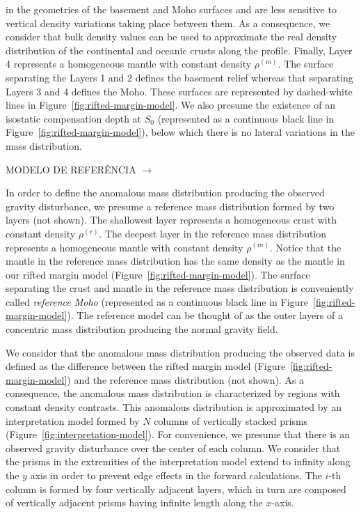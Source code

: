 \documentclass[manuscript]{geophysics}
\begin{document}
in the geometries of the basement and Moho surfaces and are less sensitive to vertical density variations 
taking place between them. As a consequence, we consider that bulk density values can be used 
to approximate the real density distribution of the continental and oceanic crusts along
the profile.
Finally, Layer 4 represents a homogeneous mantle with constant density $\rho^{(m)}$. 
The surface separating the Layers 1 and 2 defines the basement relief whereas
that separating Layers 3 and 4 defines the Moho. These surfaces are
represented by dashed-white lines in Figure~\ref{fig:rifted-margin-model}.
We also presume the existence of an isostatic compensation depth at $S_{0}$ 
(represented as a continuous black line in Figure~\ref{fig:rifted-margin-model}),
below which there is no lateral variations in the mass distribution.

MODELO DE REFERÊNCIA $\rightarrow$

In order to define the anomalous mass distribution producing the observed gravity
disturbance, we presume a reference mass distribution formed by two 
layers (not shown). The shallowest layer represents a homogeneous crust with constant
density $\rho^{(r)}$.
The deepest layer in the reference mass distribution represents a homogeneous mantle
with constant density $\rho^{(m)}$. Notice that the mantle in the reference mass 
distribution has the same density as the mantle in our rifted margin model
(Figure~\ref{fig:rifted-margin-model}).
The surface separating the crust and mantle in the reference mass distribution 
is conveniently called \textit{reference Moho} (represented as a continuous black line
in Figure~\ref{fig:rifted-margin-model}).
The reference model can be thought of as the outer layers of a concentric
mass distribution producing the normal gravity field.

We consider that the anomalous mass distribution producing the observed data
is defined as the difference between the rifted margin model 
(Figure~\ref{fig:rifted-margin-model}) and the reference mass distribution (not shown).
As a consequence, the anomalous mass distribution is characterized by regions
with constant density contrasts.
This anomalous distribution is approximated by an interpretation model 
formed by $N$ columns of vertically stacked prisms 
(Figure~\ref{fig:interpretation-model}).
For convenience, we presume that there is an observed gravity disturbance over the
center of each column.
We consider that the prisms in the extremities of the interpretation model extend to
infinity along the $y$ axis in order to prevent edge effects in the forward 
calculations. 
The $i$-th column is formed by four vertically adjacent layers, which in turn are
composed of vertically adjacent prisms having infinite length along the $x$-axis.
\end{document}
